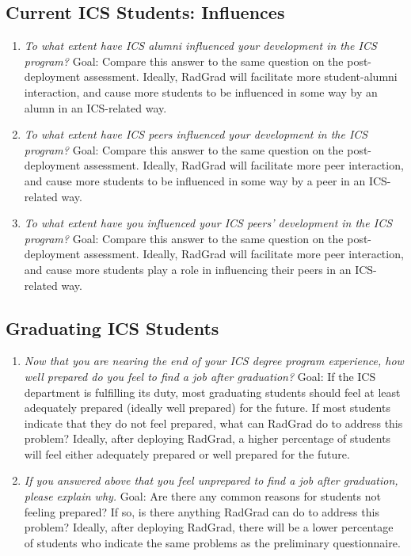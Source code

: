 \subsection{Current ICS Students: Influences}
\begin{enumerate}
\item \textit{To what extent have ICS alumni influenced your development in the ICS program?}
Goal: Compare this answer to the same question on the post-deployment assessment. Ideally, RadGrad will facilitate more student-alumni interaction, and cause more students to be influenced in some way by an alumn in an ICS-related way.
\item \textit{To what extent have ICS peers influenced your development in the ICS program?}
Goal: Compare this answer to the same question on the post-deployment assessment. Ideally, RadGrad will facilitate more peer interaction, and cause more students to be influenced in some way by a peer in an ICS-related way.
\item \textit{To what extent have you influenced your ICS peers’ development in the ICS program?}
Goal: Compare this answer to the same question on the post-deployment assessment. Ideally, RadGrad will facilitate more peer interaction, and cause more students play a role in influencing their peers in an ICS-related way.
\end{enumerate}

\subsection{Graduating ICS Students}
\begin{enumerate}
\item \textit{Now that you are nearing the end of your ICS degree program experience, how well prepared do you feel to find a job after graduation?}
Goal: If the ICS department is fulfilling its duty, most graduating students should feel at least adequately prepared (ideally well prepared) for the future. If most students indicate that they do not feel prepared, what can RadGrad do to address this problem? Ideally, after deploying RadGrad, a higher percentage of students will feel either adequately prepared or well prepared for the future.
\item \textit{If you answered above that you feel unprepared to find a job after graduation, please explain why. }
Goal: Are there any common reasons for students not feeling prepared? If so, is there anything RadGrad can do to address this problem? Ideally, after deploying RadGrad, there will be a lower percentage of students who indicate the same problems as the preliminary questionnaire. 
\end{enumerate}

